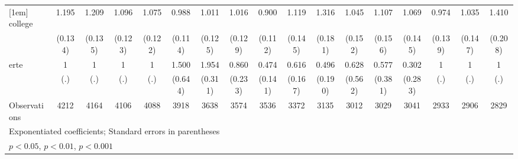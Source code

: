 {\begin{tabular}{l*{16}{c}}
[1em]
college             &       1.195         &       1.209         &       1.096         &       1.075         &       0.988         &       1.011         &       1.016         &       0.900         &       1.119         &       1.316\sym{*}  &       1.045         &       1.107         &       1.069         &       0.974         &       1.035         &       1.410\sym{*}  \\
                    &     (0.134)         &     (0.135)         &     (0.123)         &     (0.122)         &     (0.114)         &     (0.125)         &     (0.129)         &     (0.112)         &     (0.145)         &     (0.181)         &     (0.152)         &     (0.156)         &     (0.145)         &     (0.139)         &     (0.147)         &     (0.208)         \\
[1em]
erte                &           1         &           1         &           1         &           1         &       1.500         &       1.954\sym{***}&       0.860         &       0.474\sym{*}  &       0.616         &       0.496         &       0.628         &       0.577         &       0.302         &           1         &           1         &           1         \\
                    &         (.)         &         (.)         &         (.)         &         (.)         &     (0.644)         &     (0.311)         &     (0.233)         &     (0.141)         &     (0.167)         &     (0.190)         &     (0.562)         &     (0.381)         &     (0.283)         &         (.)         &         (.)         &         (.)         \\
\hline
Observations        &        4212         &        4164         &        4106         &        4088         &        3918         &        3638         &        3574         &        3536         &        3372         &        3135         &        3012         &        3029         &        3041         &        2933         &        2906         &        2829         \\
\hline\hline
\multicolumn{17}{l}{\footnotesize Exponentiated coefficients; Standard errors in parentheses}\\
\multicolumn{17}{l}{\footnotesize \sym{*} \(p<0.05\), \sym{**} \(p<0.01\), \sym{***} \(p<0.001\)}\\
\end{tabular}
}
